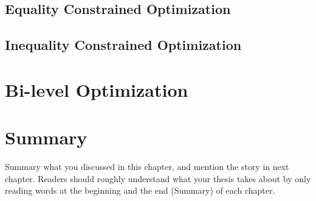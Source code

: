 \subsection{Equality Constrained Optimization}
\subsection{Inequality Constrained Optimization}

\section{Bi-level Optimization}
\label{sec:bilevel}



\section{Summary}
\label{sec:2summary}
Summary what you discussed in this chapter, and mention the story in next
chapter. Readers should roughly understand what your thesis takes about by only reading
words at the beginning and the end (Summary) of each chapter.



